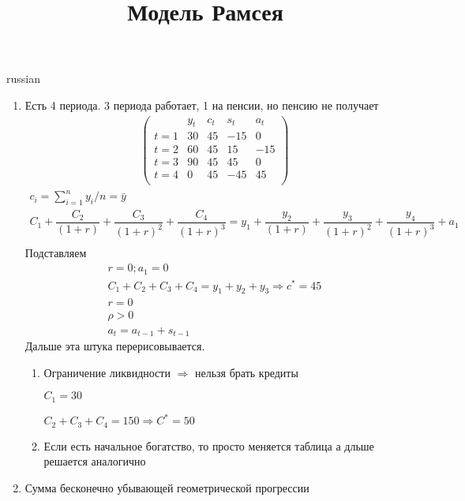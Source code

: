 \documentclass{article}
\begin{document}
\title{\foreignlanguage{russian}{Модель Рамсея}}
\maketitle
\begin{otherlanguage*}{russian}
\begin{enumerate}
\item Есть 4 периода. 3 периода работает, 1 на пенсии, но пенсию не получает
\begin{align*}
\begin{pmatrix}
\, & y_t & c_t & s_t & a_t \\
t = 1 & 30 & 45 & -15 & 0  \\
t = 2 & 60 & 45 & 15 &-15 \\
t= 3 & 90 & 45 & 45 & 0  \\
t = 4 & 0 & 45 & -45 & 45  \\
\end{pmatrix}
\end{align*}
\begin{align*}
c_i = \sum_{i=1}^n y_i / n = \bar{	y} \\
C_1 + \dfrac{C_2}{(1+r)} + \dfrac{C_3}{(1+r)^2} + \dfrac{C_4}{(1 + r)^3} = 
y_1 + \dfrac{y_2}{(1+r)} + \dfrac{y_3}{(1+r)^2} + \dfrac{y_4}{(1 + r)^3} + a_1\\ 
\end{align*}
Подставляем
\begin{align*}
r = 0; a_1 = 0 \\
C_1 + C_2 + C_3 + C_4 = y_1 + y_2 + y _3 \Rightarrow c^* = 45  \\
r = 0 \\
\rho > 0 \\
a_t = a_{t-1} + s_{t-1}
\end{align*}
Дальше эта штука перерисовывается. 

\begin{enumerate}

\item Ограничение ликвидности $ \Rightarrow $ нельзя брать кредиты 
 
$ C_1 = 30 $ 

$ C_2 + C_3 + C_4  = 150 \Rightarrow C^* = 50 $ 

\item Если есть начальное богатство, то просто меняется таблица а дльше решается аналогично 
\end{enumerate}

\item Сумма бесконечно убывающей геометрической прогрессии


\end{enumerate}
\end{otherlanguage*}
\end{document}
